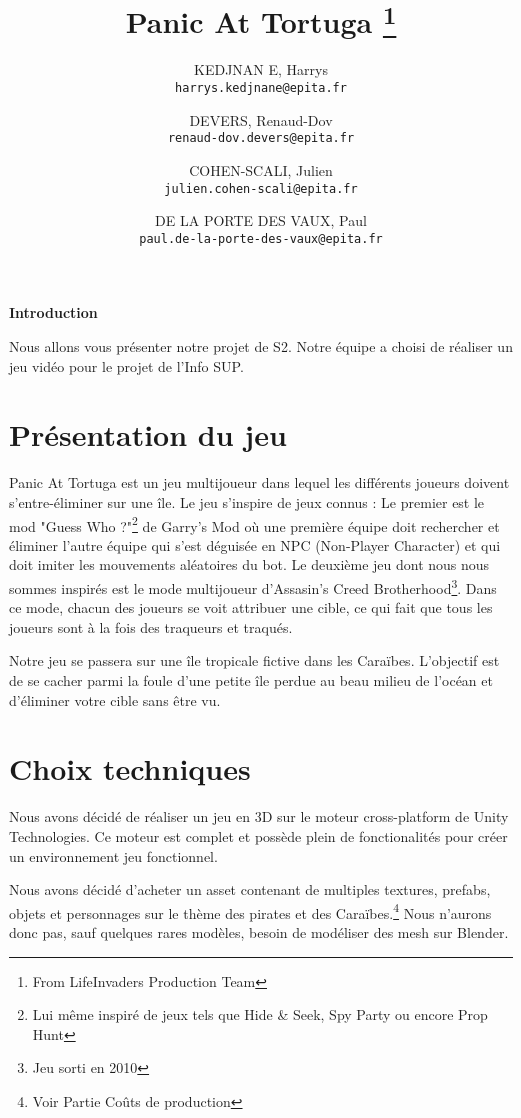 \documentclass[french, 12pt, a4paper,twoside]{article}
\title{Panic At Tortuga \thanks{From LifeInvaders Production Team}}
\author{
    KEDJNAN
    E, Harrys\\
    \texttt{harrys.kedjnane@epita.fr}
    \and
    DEVERS, Renaud-Dov\\
    \texttt{renaud-dov.devers@epita.fr}
    \and
    COHEN-SCALI, Julien\\
    \texttt{julien.cohen-scali@epita.fr}
    \and
    DE LA PORTE DES VAUX, Paul\\
    \texttt{paul.de-la-porte-des-vaux@epita.fr}
    
}
\begin{document}
\begin{titlepage}
\maketitle
\end{titlepage}

\begin{center}
    \textbf{Introduction}

    Nous allons vous présenter notre projet de S2.
    Notre équipe a choisi de réaliser un jeu vidéo pour le projet de l'Info SUP.
\end{center}

\tableofcontents
\newpage

\section{Présentation du jeu}
\begin{flushleft}
    Panic At Tortuga est un jeu multijoueur dans lequel les différents joueurs doivent s'entre-éliminer sur une île.
    Le jeu s'inspire de jeux connus : Le premier est le mod "Guess Who ?"\footnote{Lui même inspiré de jeux tels que Hide \& Seek, Spy Party ou encore Prop Hunt} de Garry's Mod
        où une première équipe doit rechercher et éliminer l'autre équipe qui s'est déguisée en NPC (Non-Player Character) et qui doit imiter les mouvements aléatoires du bot.
    Le deuxième jeu dont nous nous sommes inspirés est le mode multijoueur d'Assasin's Creed Brotherhood\footnote{Jeu sorti en 2010}.
    Dans ce mode, chacun des joueurs se voit attribuer une cible, ce qui fait que tous les joueurs sont à la fois des traqueurs et traqués.

    Notre jeu se passera sur une île tropicale fictive dans les Caraïbes.
    L'objectif est de se cacher parmi la foule d'une petite île perdue au beau milieu de l'océan et d'éliminer votre cible sans être vu.
\end{flushleft}


\section{Choix techniques}

Nous avons décidé de réaliser un jeu en 3D sur le moteur cross-platform de Unity Technologies.
Ce moteur est complet et possède plein de fonctionalités pour créer un environnement jeu fonctionnel.

Nous avons décidé d'acheter un asset contenant de multiples textures, prefabs, objets et personnages sur le thème des pirates et des Caraïbes.\footnote{Voir Partie Coûts de production}
Nous n'aurons donc pas, sauf quelques rares modèles, besoin de modéliser des mesh sur Blender.
\end{document}
